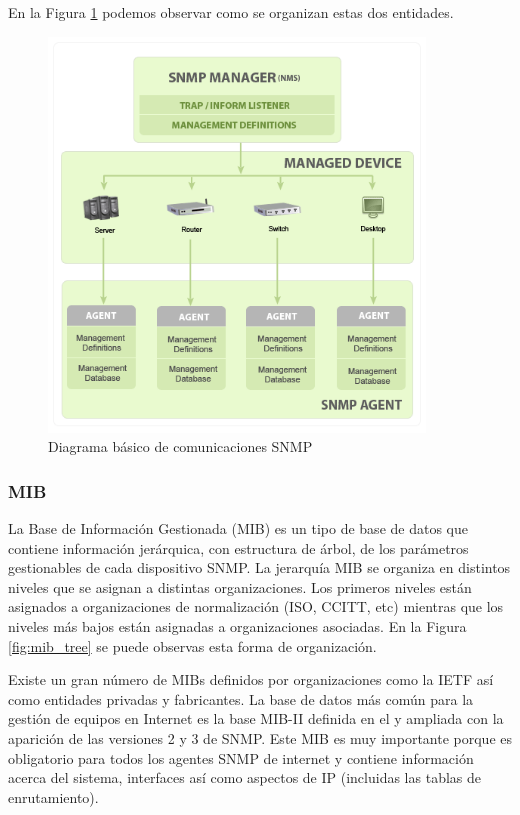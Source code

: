 En la Figura \ref{fig:diagrama_comunicaciones_snmp} podemos observar como se organizan estas dos
entidades. 

\begin{figure}[ht]
    \centering
    \includegraphics[width=10cm]{graphics/snmp-components}
    \caption{Diagrama básico de comunicaciones SNMP}
    \label{fig:diagrama_comunicaciones_snmp}
\end{figure}

\subsubsection{\gls{MIB}}
La Base de Información Gestionada (\gls{MIB}) es un tipo de base de datos que contiene información
jerárquica, con estructura de árbol, de los parámetros gestionables de cada dispositivo SNMP. La
jerarquía MIB se organiza en distintos niveles que se asignan a distintas organizaciones. Los 
primeros niveles están asignados a organizaciones de normalización (ISO, CCITT, etc) mientras que 
los niveles más bajos están asignadas a organizaciones asociadas. En la Figura \ref{fig:mib_tree} 
se puede observas esta forma de organización.

Existe un gran número de MIBs definidos por organizaciones como la \gls{IETF} así como entidades
privadas y fabricantes. La base de datos más común para la gestión de equipos en Internet es la base
MIB-II definida en el  y ampliada con la aparición de las versiones 2 y 3 de SNMP. 
Este MIB es muy importante porque es obligatorio para todos los agentes SNMP de internet y contiene
información acerca del sistema, interfaces así como aspectos de IP (incluidas las tablas de
enrutamiento).

